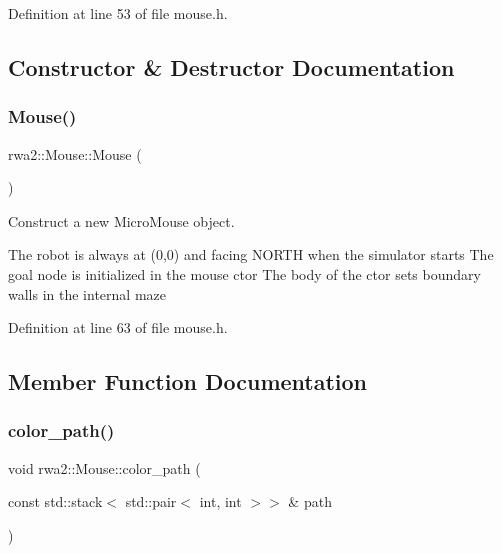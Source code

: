 Definition at line 53 of file mouse.\+h.



\subsection{Constructor \& Destructor Documentation}
\mbox{\label{classrwa2_1_1_mouse_a048dffae3aaa3a6ddc2c6cc4741a097c}} 
\subsubsection{\texorpdfstring{Mouse()}{Mouse()}}
{\footnotesize\ttfamily rwa2\+::\+Mouse\+::\+Mouse (\begin{DoxyParamCaption}{ }\end{DoxyParamCaption})\hspace{0.3cm}{\ttfamily [inline]}}



Construct a new Micro\+Mouse object. 

The robot is always at (0,0) and facing N\+O\+R\+TH when the simulator starts The goal node is initialized in the mouse ctor The body of the ctor sets boundary walls in the internal maze 

Definition at line 63 of file mouse.\+h.



\subsection{Member Function Documentation}
\mbox{\label{classrwa2_1_1_mouse_ac855fa63f17bb4ea650401ad2dae44b6}} 
\subsubsection{\texorpdfstring{color\+\_\+path()}{color\_path()}}
{\footnotesize\ttfamily void rwa2\+::\+Mouse\+::color\+\_\+path (\begin{DoxyParamCaption}\item[{const std\+::stack$<$ std\+::pair$<$ int, int $>$$>$ \&}]{path }\end{DoxyParamCaption})}



